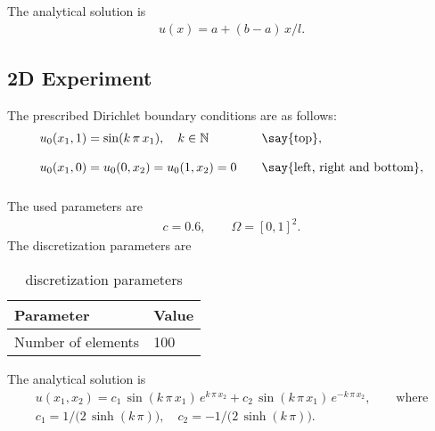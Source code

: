 The analytical solution is
\begin{equation*}
\begin{array}{lll}
  u(x) = a + (b-a)\,x/l.
\end{array}
\end{equation*}

\subsection{2D Experiment}
%
The prescribed Dirichlet boundary conditions are as follows:
\begin{equation*}
\begin{array}{lll}
  u_0(x_1,1) = \sin(k\,\pi\,x_1), \quad k \in \N  \qquad &\text{\say{top}},\\[4mm]
  u_0(x_1,0) = u_0(0,x_2) = u_0(1,x_2) = 0  \quad &\text{\say{left, right and bottom}},\\[4mm]
\end{array}
\end{equation*}
%
The used parameters are
\begin{equation*}
\begin{array}{lll}
  c = 0.6,\qquad \Omega = [0,1]^2.
\end{array}
\end{equation*}
%
The discretization parameters are
\begin{table}[h!]
  \centering%
\begin{center}
  \begin{tabular}{l|l}
    \textbf{Parameter} & \textbf{Value}\\
    \hline
    Number of elements & 100\\
  \end{tabular}
\end{center}
\caption{discretization parameters}
\label{tab:table1}
\end{table}
%
The analytical solution is
\begin{equation*}
\begin{array}{lll}
  u(x_1,x_2) = c_1\,\sin(k\,\pi\,x_1)\,e^{k\,\pi\,x_2} + c_2\,\sin(k\,\pi\,x_1)\,e^{-k\,\pi\,x_2}, \qquad \text{where}\\[4mm]
  c_1 = 1/\big(2\,\sinh(k\,\pi)\big), \quad c_2=-1/\big(2\,\sinh(k\,\pi)\big).
\end{array}
\end{equation*}
%
